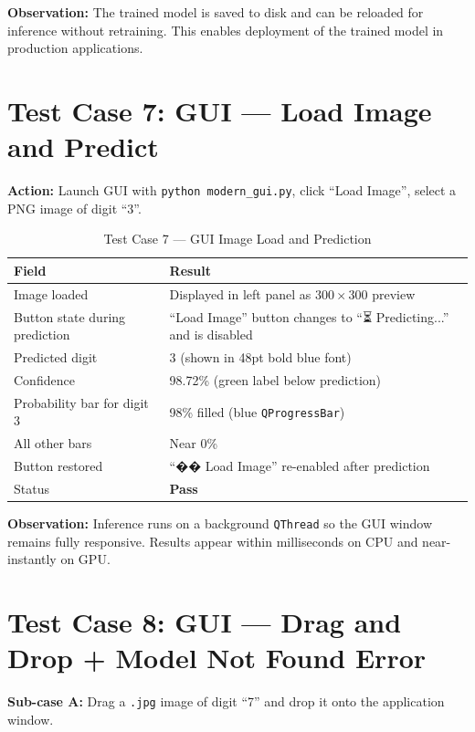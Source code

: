 \documentclass[12pt,a4paper,openany]{report}
\begin{document}
\textbf{Observation:} The trained model is saved to disk and can be reloaded for inference without retraining. This enables deployment of the trained model in production applications.

\section{Test Case 7: GUI --- Load Image and Predict}

\textbf{Action:} Launch GUI with \texttt{python modern\_gui.py}, click ``Load Image'', select a PNG image of digit ``3''.

\begin{table}[H]
\centering
\begin{tabular}{|l|p{9cm}|}
\hline
\textbf{Field}            & \textbf{Result} \\
\hline
Image loaded              & Displayed in left panel as $300 \times 300$ preview \\
Button state during prediction & ``Load Image'' button changes to ``⏳ Predicting...'' and is disabled \\
Predicted digit           & 3 (shown in 48pt bold blue font) \\
Confidence                & 98.72\% (green label below prediction) \\
Probability bar for digit 3 & 98\% filled (blue \texttt{QProgressBar}) \\
All other bars            & Near 0\% \\
Button restored           & ``�� Load Image'' re-enabled after prediction \\
Status                    & \textbf{Pass} \\
\hline
\end{tabular}
\caption{Test Case 7 --- GUI Image Load and Prediction}
\end{table}

\textbf{Observation:} Inference runs on a background \texttt{QThread} so the GUI window remains fully responsive. Results appear within milliseconds on CPU and near-instantly on GPU.

\section{Test Case 8: GUI --- Drag and Drop + Model Not Found Error}

\textbf{Sub-case A:} Drag a \texttt{.jpg} image of digit ``7'' and drop it onto the application window.
\end{document}
